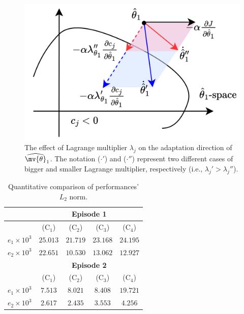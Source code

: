 \documentclass[lettersize,journal]{IEEEtran}
\begin{document}
\begin{figure}[!t]
	\centering
	\includegraphics[width=0.6\linewidth]{
		src/figures/lambda_effect.drawio.pdf
		}
	\caption{
		The effect of Lagrange multiplier $\lambda_{j}$ on the adaptation direction of $\widehat{ \mv{\theta}}_1$.
		The notation ($\cdot'$) and ($\cdot''$) represent two different cases of bigger and smaller Lagrange multiplier, respectively (i.e., $\lambda_{j}' > \lambda_{j}''$).
	}
	\label{fig:lambda_effect}
\end{figure}

\begin{table}[!t]
    \renewcommand{\arraystretch}{1.3}
    \caption{Quantitative comparison of performances' $L_2$ norm.}
    \centering
    \begin{tabular}{c c c c c}
    \hline
		& \multicolumn{4}{c}{\textbf{Episode 1}} \\
    \hline
	\hline 
		& (C$_1$) & (C$_2$) & (C$_3$) & (C$_4$) \\
	\hline
		$e_1\times10^{3}$ & $25.013$ & $21.719$ & $23.168$ & $24.195$ \\
	\hline
        $e_2\times10^{3}$ & $22.651$ & $10.530$ & $13.062$ & $12.927$ \\
	\hline
        & \multicolumn{4}{c}{\textbf{Episode 2}} \\
    \hline
    \hline
        & (C$_1$) & (C$_2$) & (C$_3$) & (C$_4$) \\
	\hline
		$e_1\times10^{3}$ & $7.513$ & $8.021$ & $8.408$ & $19.721$ \\
	\hline
        $e_2\times10^{3}$ & $2.617$ & $2.435$ & $3.553$ & $4.256$ \\
    \hline
    \end{tabular}
    \label{tab:sim:L2}
\end{table}
\end{document}
